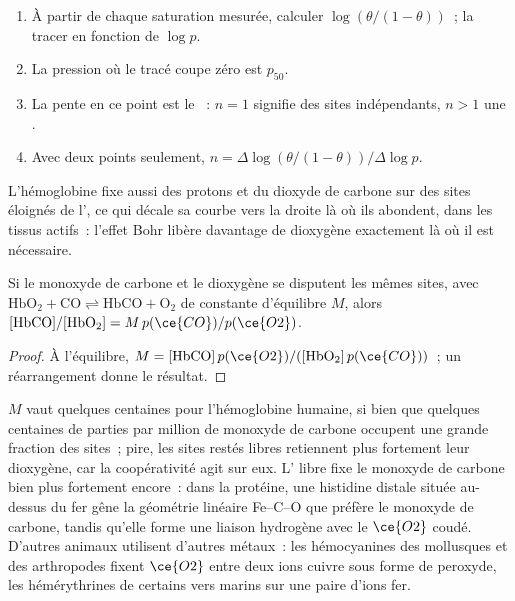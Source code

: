 \begin{method}\label{met:b3:bioinorganic:hill-plot}
\begin{enumerate}
  \item À partir de chaque saturation mesurée, calculer $\log(\theta/(1 - \theta))$~; la tracer en fonction de $\log p$.
  \item La pression où le tracé coupe zéro est $p_{50}$.
  \item La pente en ce point est le ~: $n = 1$ signifie des sites
        indépendants, $n > 1$ une .
  \item Avec deux points seulement, $n = \Delta\log(\theta/(1 - \theta))/\Delta\log p$.
\end{enumerate}
\end{method}

L'hémoglobine fixe aussi des protons et du dioxyde de carbone sur des sites
éloignés de l', ce qui décale sa courbe vers la droite là où ils
abondent, dans les tissus actifs~: l'effet Bohr libère davantage de
dioxygène exactement là où il est nécessaire.

\begin{proposition}\label{prop:b3:bioinorganic:haldane}
Si le monoxyde de carbone et le dioxygène se disputent les mêmes sites, avec
$\mathrm{HbO_2 + CO \rightleftharpoons HbCO + O_2}$ de constante d'équilibre $M$, alors
$[\mathrm{HbCO}]/[\mathrm{HbO_2}] = M\,p(\ce{CO})/p(\ce{O2})$.
\end{proposition}

\begin{proof}
À l'équilibre, $M = [\mathrm{HbCO}]\,p(\ce{O2})/([\mathrm{HbO_2}]\,p(\ce{CO}))$~; un réarrangement donne le résultat.
\end{proof}

$M$ vaut quelques centaines pour l'hémoglobine humaine, si bien que
quelques centaines de parties par million de monoxyde de carbone occupent
une grande fraction des sites~; pire, les sites restés libres retiennent
plus fortement leur dioxygène, car la coopérativité agit sur eux. L'
libre fixe le monoxyde de carbone bien plus fortement encore~: dans la
protéine, une histidine distale située au-dessus du fer gêne la géométrie
linéaire Fe--C--O que préfère le monoxyde de carbone, tandis qu'elle forme une liaison hydrogène avec le
$\ce{O2}$ coudé. D'autres animaux utilisent d'autres métaux~: les hémocyanines des mollusques et des arthropodes
fixent $\ce{O2}$ entre deux ions cuivre sous forme de peroxyde, les hémérythrines de certains
vers marins sur une paire d'ions fer.


